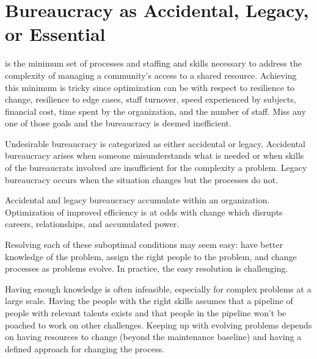 \section{Bureaucracy as Accidental, Legacy, or Essential}

\iftoggle{glossarysubstitutionworks}{\Gls{essential bureaucracy}}{Essential bureaucracy}
\iftoggle{glossaryinmargin}{\marginpar{[Glossary]}}{} is the minimum set of processes and staffing and skills necessary to address the complexity of managing a community's access to a \gls{shared resource}.
\iftoggle{glossaryinmargin}{\marginpar{[Glossary]}}{} Achieving this minimum is tricky since optimization can be with respect to resilience to change, resilience to edge cases, staff turnover, speed experienced by subjects, financial cost, time spent by the organization, and the number of staff. Miss any one of those goals and the bureaucracy is deemed inefficient.

Undesirable bureaucracy is categorized as either accidental or legacy. Accidental bureaucracy arises when someone misunderstands what is needed or when skills of the bureaucrats involved are insufficient for the complexity a problem. Legacy bureaucracy occurs when the situation changes but the processes do not. 

Accidental and legacy bureaucracy accumulate within an organization. Optimization of improved efficiency is at odds with change which disrupts careers, relationships, and accumulated power. 

Resolving each of these suboptimal conditions may seem easy: have better knowledge of the problem, assign the right people to the problem, and change processes as problems evolve.  In practice, the easy resolution is challenging. 

Having enough knowledge is often infeasible, especially for complex problems at a large scale. Having the people with the right skills assumes that a pipeline of people with relevant talents exists and that people in the pipeline won't be poached to work on other challenges. Keeping up with evolving problems depends on having resources to change (beyond the maintenance baseline) and having a defined approach for changing the process. 